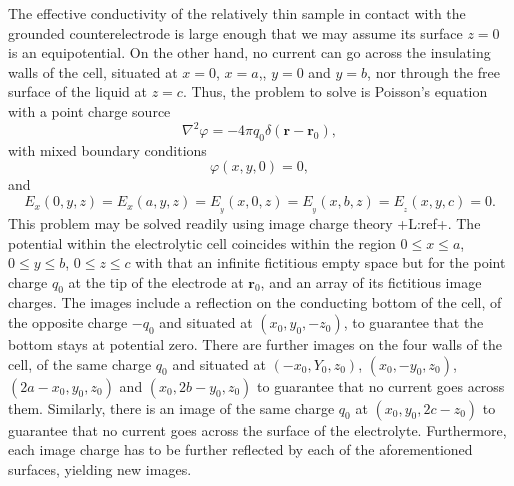 \documentclass{article}
\newcommand{\notaL}[1]{{\color{blue}+L:#1+}}
\begin{document}
The effective conductivity of the relatively thin sample in contact
with the grounded counterelectrode is large enough that we may assume its
surface $z=0$ is an equipotential.
On the other hand, no current can go across the insulating walls of
the cell, situated at $x=0$, $x=a$,, $y=0$ and $y=b$, nor through the
free surface of the liquid at $z=c$. Thus, the problem to solve is Poisson's
equation with a point charge source
\begin{equation}
  \label{eq:poisson}
  \nabla^2\varphi=-4\pi q_0\delta(\bm r-\bm r_0),
\end{equation}
with mixed boundary conditions
\begin{equation}
  \label{eq:ground}
  \varphi(x,y,0)=0,
\end{equation}
and
\begin{equation}
E_x(0, y ,z)= E_x(a, y ,z)=E_{{_y}}(x, 0 ,z)=E_{{_y}}(x, b
,z)=E_{{_z}}(x, y ,c)=0.
\end{equation}
This problem may be solved readily using image charge theory
\notaL{ref}. The potential within the electrolytic cell coincides
within the region $0\le x\le a$, $0\le y \le b$, $0\le z\le c$
with that an infinite fictitious empty space but for the point charge
$q_0$ at the tip of the electrode at $\bm r_0$, and an array of its fictitious image
charges. The images include a reflection on the conducting bottom of the
cell, of the opposite charge $-q_0$ and situated at $(x_0, y_0,-z_0)$,
to guarantee that the bottom stays at potential zero.
There are further images on the four walls of the cell, of the same charge $q_0$
and situated at $(-x_0,Y_0,z_0)$, $(x_0,-y_0, z_0)$, $(2a-x_0, y_0,
z_0)$ and $(x_0, 2b-y_0,z_0)$ to guarantee that no current goes across
them. Similarly, there is an image of the same charge $q_0$ at
$(x_0,y_0,2c-z_0)$ to guarantee that no current goes across the
surface of the electrolyte. Furthermore, each image charge has to be
further reflected by each of the aforementioned surfaces, yielding new
images.
\end{document}
